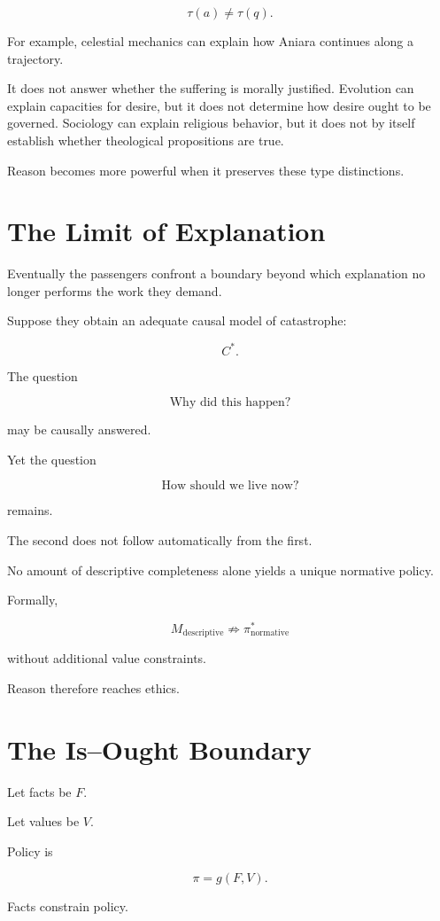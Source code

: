 \documentclass[11pt,oneside]{book}
\theoremstyle{definition}
\theoremstyle{remark}
\begin{document}
\[
\tau(a)\neq\tau(q).
\]

For example, celestial mechanics can explain how Aniara continues along a trajectory.

It does not answer whether the suffering is morally justified. Evolution can explain capacities for desire, but it does not determine how desire ought to be governed. Sociology can explain religious behavior, but it does not by itself establish whether theological propositions are true.

Reason becomes more powerful when it preserves these type distinctions.

\section{The Limit of Explanation}

Eventually the passengers confront a boundary beyond which explanation no longer performs the work they demand.

Suppose they obtain an adequate causal model of catastrophe:

\[
C^\ast.
\]

The question

\[
\text{Why did this happen?}
\]

may be causally answered.

Yet the question

\[
\text{How should we live now?}
\]

remains.

The second does not follow automatically from the first.

No amount of descriptive completeness alone yields a unique normative policy.

Formally,

\[
M_{\mathrm{descriptive}}
\not\Rightarrow
\pi^\ast_{\mathrm{normative}}
\]

without additional value constraints.

Reason therefore reaches ethics.

\section{The Is--Ought Boundary}

Let facts be \(F\).

Let values be \(V\).

Policy is

\[
\pi
=
g(F,V).
\]

Facts constrain policy.
\end{document}
